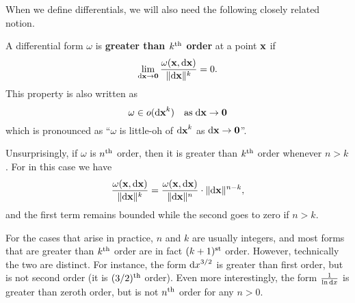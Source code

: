 \documentclass{amsart}
\begin{document}
When we define differentials, we will also need the following closely related notion.

\begin{defn}
  A differential form $\omega$ is \textbf{greater than $k^{\mathrm{th}}$ order} at a point $\mathbf{x}$ if
  \[ \lim_{{\mathrm{d} \mathbf{x}}\to\mathbf{0}} \frac{\omega(\mathbf{x},{\mathrm{d} \mathbf{x}})}{\Vert {\ensuremath{\mathrm{d} \mathbf{x}}} \Vert^k} = 0. \]
  This property is also written as
  \[ \omega \in o({\mathrm{d} \mathbf{x}}^k) \quad\text{as}\;{\mathrm{d} \mathbf{x}}\to\mathbf{0} \]
  which is pronounced as ``$\omega$ is little-oh of ${\mathrm{d} \mathbf{x}}^k$ as ${\mathrm{d} \mathbf{x}}\to\mathbf{0}$''.
\end{defn}

Unsurprisingly, if $\omega$ is $n^{\mathrm{th}}$ order, then it is greater than $k^{\mathrm{th}}$ order whenever $n>k$.
For in this case we have
\[\frac{\omega(\mathbf{x},{\mathrm{d} \mathbf{x}})}{\Vert {\ensuremath{\mathrm{d} \mathbf{x}}} \Vert^k} = \frac{\omega(\mathbf{x},{\mathrm{d} \mathbf{x}})}{\Vert {\ensuremath{\mathrm{d} \mathbf{x}}} \Vert^n} \cdot \Vert {\ensuremath{\mathrm{d} \mathbf{x}}} \Vert^{n-k}, \]
and the first term remains bounded while the second goes to zero if $n>k$.

For the cases that arise in practice, $n$ and $k$ are usually integers, and most forms that are greater than $k^{\mathrm{th}}$ order are in fact $(k+1)^{\mathrm{st}}$ order.
However, technically the two are distinct.
For instance, the form ${\mathrm{d} x}^{3/2}$ is greater than first order, but is not second order (it is $(3/2)^{\mathrm{th}}$ order).
Even more interestingly, the form $\frac{1}{\ln{\ensuremath{\mathrm{d} x}}}$ is greater than zeroth order, but is not $n^{\mathrm{th}}$ order for any $n>0$.
\end{document}
